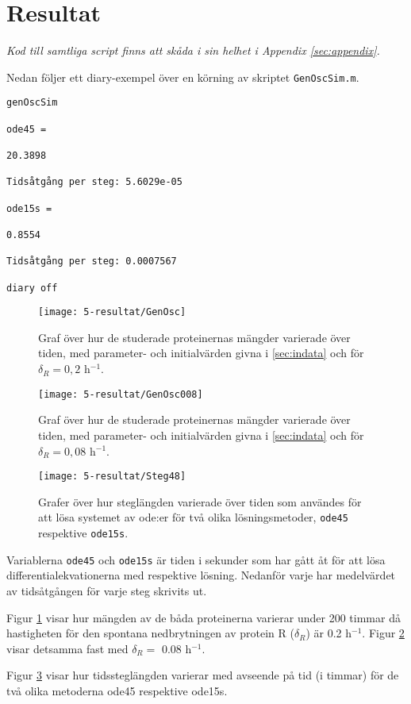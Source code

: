 \section{Resultat}
\label{sec:resultat}

\emph{Kod till samtliga script finns att skåda i sin helhet i Appendix \ref{sec:appendix}.}

Nedan följer ett diary-exempel över en körning av skriptet \texttt{GenOscSim.m}.

\begin{verbatim}
genOscSim

ode45 =

20.3898

Tidsåtgång per steg: 5.6029e-05

ode15s =

0.8554

Tidsåtgång per steg: 0.0007567

diary off
\end{verbatim}

\begin{figure}[H]
\centering
\texttt{[image: 5-resultat/GenOsc]}
\caption{Graf över hur de studerade proteinernas mängder varierade över tiden, med parameter- och initialvärden givna i \ref{sec:indata} och för $\delta_R = 0,2$ h$^{-1}$.}
\label{fig:GenOsc}
\end{figure}

\begin{figure}[H]
	\centering
	\texttt{[image: 5-resultat/GenOsc008]}
	\caption{Graf över hur de studerade proteinernas mängder varierade över tiden, med parameter- och initialvärden givna i \ref{sec:indata} och för $\delta_R = 0,08$ h$^{-1}$.}
	\label{fig:GenOsc008}
\end{figure}

\begin{figure}[H]
	\centering
	\texttt{[image: 5-resultat/Steg48]}
	\caption{Grafer över hur steglängden varierade över tiden som användes för att lösa systemet av ode:er för två olika lösningsmetoder, \texttt{ode45} respektive \texttt{ode15s}.}
	\label{fig:Steg48}
\end{figure}

Variablerna \texttt{ode45} och \texttt{ode15s} är tiden i sekunder som har gått åt för att lösa differentialekvationerna med respektive lösning. Nedanför varje har medelvärdet av tidsåtgången för varje steg skrivits ut.

Figur \ref{fig:GenOsc} visar hur mängden av de båda proteinerna varierar under 200 timmar då hastigheten för den spontana nedbrytningen av protein R ($\delta_R$) är 0.2 h$^{-1}$. Figur \ref{fig:GenOsc008} visar detsamma fast med $\delta_R =$ 0.08 h$^{-1}$.

Figur \ref{fig:Steg48} visar hur tidssteglängden varierar med avseende på tid (i timmar) för de två olika metoderna ode45 respektive ode15s.